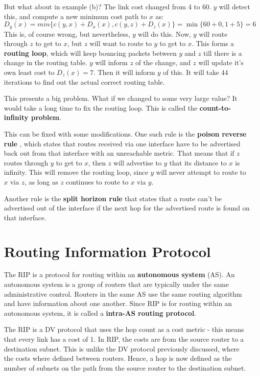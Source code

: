 \documentclass[12pt,letterpaper]{book}
\theoremstyle{definition}
\begin{document}
But what about in example (b)? The link cost changed from 4 to 60. $y$ will detect this, and compute a new minimum cost path to $x$ as:
\[D_y(x) = min \{c(y,x) + D_x(x), c(y,z) + D_z(x)\} = \min \{60 + 0, 1 + 5\} = 6\]
This is, of course wrong, but nevertheless, $y$ will do this. Now, $y$ will route through $z$ to get to $x$, but $z$ will want to route to $y$ to get to $x$. This forms a \textbf{routing loop}, which will keep bouncing packets between $y$ and $z$ till there is a change in the routing table. $y$ will inform $z$ of the change, and $z$ will update it's own least cost to $D_z(x) = 7$. Then it will inform $y$ of this. It will take 44 iterations to find out the actual correct routing table.

This presents a big problem. What if we changed to some very large value? It would take a long time to fix the routing loop. This is called the \textbf{count-to-infinity problem}.

This can be fixed with some modifications. One such rule is the \textbf{poison reverse rule} , which states that routes received via one interface have to be advertised back out from that interface with an unreachable metric. That means that if $z$ routes through $y$ to get to $x$, then $z$ will advertise to $y$ that its distance to $x$ is infinity. This will remove the routing loop, since $y$ will never attempt to route to $x$ via $z$, as long as $z$ continues to route to $x$ via $y$.

Another rule is the \textbf{split horizon rule}  that states that a route can't be advertised out of the interface if the next hop for the advertised route is found on that interface.

\section{Routing Information Protocol}

The RIP is a protocol for routing within an \textbf{autonomous system} (AS). An autonomous system is a group of routers that are typically under the same administrative control. Routers in the same AS use the same routing algorithm and have information about one another. Since RIP is for routing within an autonomous system, it is called a \textbf{intra-AS routing protocol}.

The RIP is a DV protocol that uses the hop count as a cost metric - this means that every link has a cost of 1. In RIP, the costs are from the source router to a destination subnet. This is unlike the DV protocol previously discussed, where the costs where defined between routers. Hence, a hop is now defined as the number of subnets on the path from the source router to the destination subnet.
\end{document}
